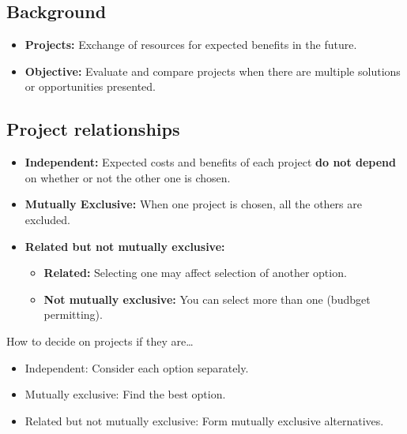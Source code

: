 \subsection{Background}
\begin{intuition}
    \begin{itemize}
        \item \textbf{Projects:} Exchange of resources for expected benefits in the future. 
        \item \textbf{Objective:} Evaluate and compare projects when there are multiple solutions or opportunities presented. 
    \end{itemize}
\end{intuition}

\subsection{Project relationships}
\begin{definition}
    \begin{itemize}
        \item \textbf{Independent:} Expected costs and benefits of each project \textbf{do not depend} on whether or not the other one is chosen.
        \item \textbf{Mutually Exclusive:} When one project is chosen, all the others are excluded.
        \item \textbf{Related but not mutually exclusive:}
        \begin{itemize}
            \item \textbf{Related:} Selecting one may affect selection of another option.
            \item \textbf{Not mutually exclusive:} You can select more than one (budbget permitting).
        \end{itemize}
    \end{itemize}
\end{definition}

\begin{intuition}
    How to decide on projects if they are\dots
    \begin{itemize}
        \item Independent: Consider each option separately.
        \item Mutually exclusive: Find the best option.
        \item Related but not mutually exclusive: Form mutually exclusive alternatives.
    \end{itemize}
\end{intuition}

